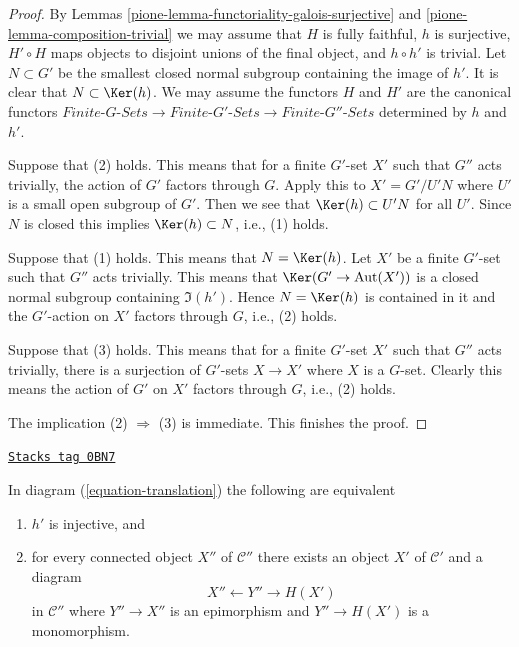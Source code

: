 \begin{proof}

By Lemmas \ref{pione-lemma-functoriality-galois-surjective} and
\ref{pione-lemma-composition-trivial} we may assume that
$H$ is fully faithful, $h$ is surjective, $H' \circ H$ maps
objects to disjoint unions of the final object, and $h \circ h'$
is trivial. Let $N \subset G'$ be the smallest closed normal
subgroup containing the image of $h'$. It is clear that
$N \subset \Ker(h)$.
We may assume the functors $H$ and $H'$ are the canonical functors
$\textit{Finite-}G\textit{-Sets} \to \textit{Finite-}G'\textit{-Sets}
\to \textit{Finite-}G''\textit{-Sets}$ determined by $h$ and $h'$.

\medskip\noindent
Suppose that (2) holds. This means that for a finite $G'$-set $X'$
such that $G''$ acts trivially, the action of $G'$ factors through $G$.
Apply this to $X' = G'/U'N$ where $U'$ is a small open subgroup of $G'$.
Then we see that $\Ker(h) \subset U'N$ for all $U'$. Since $N$ is closed
this implies $\Ker(h) \subset N$, i.e., (1) holds.

\medskip\noindent
Suppose that (1) holds. This means that $N = \Ker(h)$. Let $X'$ be a
finite $G'$-set such that $G''$ acts trivially. This means that
$\Ker(G' \to \text{Aut}(X'))$ is a closed normal subgroup containing
$\Im(h')$. Hence $N = \Ker(h)$ is contained in it and the $G'$-action
on $X'$ factors through $G$, i.e., (2) holds.

\medskip\noindent
Suppose that (3) holds. This means that for a finite $G'$-set $X'$
such that $G''$ acts trivially, there is a surjection of $G'$-sets
$X \to X'$ where $X$ is a $G$-set. Clearly this means the action of
$G'$ on $X'$ factors through $G$, i.e., (2) holds.

\medskip\noindent
The implication (2) $\Rightarrow$ (3) is immediate. This finishes the proof.
\end{proof}

\begin{lemma}
\label{pione-lemma-functoriality-galois-injective}
\href{https://stacks.math.columbia.edu/tag/0BN7}{\texttt{Stacks tag 0BN7}}

In diagram (\ref{equation-translation}) the following are equivalent
\begin{enumerate}
\item $h'$ is injective, and
\item for every connected object $X''$ of $\mathcal{C}''$
there exists an object $X'$ of $\mathcal{C}'$ and a diagram
$$
X'' \leftarrow Y'' \rightarrow H(X')
$$
in $\mathcal{C}''$ where $Y'' \to X''$ is an epimorphism and
$Y'' \to H(X')$ is a monomorphism.
\end{enumerate}
\end{lemma}

